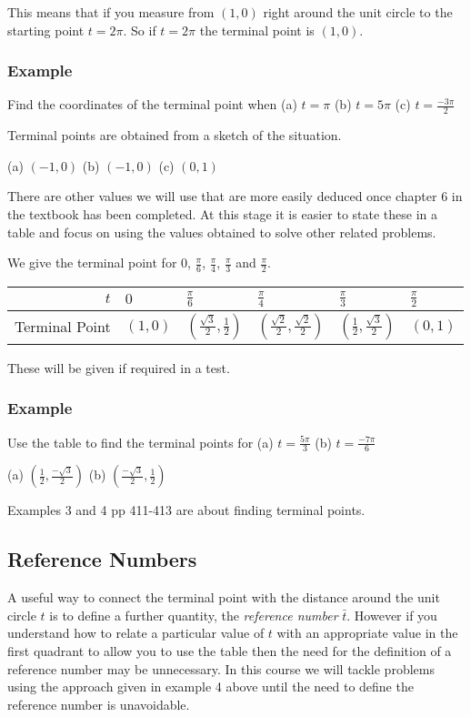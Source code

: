 This means that if you measure from $\left (1 ,0\right )$ right around the unit circle to the starting point $t =2 \pi $. So if $t =2 \pi $ the terminal point is $\left (1 ,0\right )$. 

\subsubsection{Example}
Find the coordinates of the terminal point when (a) $t =\pi $ (b) $t =5 \pi $ (c) $t =\frac{ -3 \pi }{2}$ 

Terminal points are obtained from a sketch of the situation. 

(a) $\left ( -1 ,0\right )$ (b) $\left ( -1 ,0\right )$ (c) $\left (0 ,1\right )$ 

There are other values we will use
that are more easily deduced once chapter 6 in the textbook has been completed. At this stage it is easier to
state these in a table and focus on using the values obtained to solve other related problems. 

We give the terminal point for $0$, $\frac{\pi }{6}$, $\frac{\pi }{4}$, $\frac{\pi }{3}$ and $\frac{\pi }{2}$. 


\begin{tabular}[c]{|r|l|l|l|l|l|}\hline
	$t$  & $0$  & $\frac{\pi }{6}$  & $\frac{\pi }{4}$  & $\frac{\pi }{3}$  & $\frac{\pi }{2}$  \\
	\hline
	Terminal Point  & $\left (1 ,0\right )$  & $\left (\frac{\sqrt{3}}{2} ,\frac{1}{2}\right )$  & $\left (\frac{\sqrt{2}}{2} ,\frac{\sqrt{2}}{2}\right )$  & $\left (\frac{1}{2} ,\frac{\sqrt{3}}{2}\right )$  & $\left (0 ,1\right )$  \\
	\hline
\end{tabular}

These will be given if required in a test. 

\subsubsection{Example}
Use the table to find the terminal points for (a) $t =\frac{5 \pi }{3}$ (b) $t =\frac{ -7 \pi }{6}$ 

(a) $\left (\frac{1}{2} ,\frac{ -\sqrt{3}}{2}\right )$ (b) $\left (\frac{ -\sqrt{3}}{2} ,\frac{1}{2}\right )$ 

Examples 3 and 4 pp 411-413 are about finding
terminal points. 

\subsection{Reference Numbers}
A useful way to connect the terminal point with the distance around the unit circle $t$ is to define a further quantity, the \emph{reference number} $\bar{t}$. However if you understand how to relate a particular value of $t$ with an appropriate value in the first quadrant to allow you to use the table then the need for the definition of a reference
number may be unnecessary. In this course we will tackle problems using the approach given in example 4 above
until the need to define the reference number is unavoidable. 

